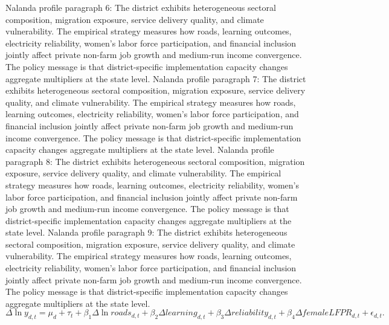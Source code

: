 \documentclass[preprint,12pt]{elsarticle}
\begin{document}
Nalanda profile paragraph 6: The district exhibits heterogeneous sectoral composition, migration exposure, service delivery quality, and climate vulnerability. The empirical strategy measures how roads, learning outcomes, electricity reliability, women's labor force participation, and financial inclusion jointly affect private non-farm job growth and medium-run income convergence. The policy message is that district-specific implementation capacity changes aggregate multipliers at the state level.
Nalanda profile paragraph 7: The district exhibits heterogeneous sectoral composition, migration exposure, service delivery quality, and climate vulnerability. The empirical strategy measures how roads, learning outcomes, electricity reliability, women's labor force participation, and financial inclusion jointly affect private non-farm job growth and medium-run income convergence. The policy message is that district-specific implementation capacity changes aggregate multipliers at the state level.
Nalanda profile paragraph 8: The district exhibits heterogeneous sectoral composition, migration exposure, service delivery quality, and climate vulnerability. The empirical strategy measures how roads, learning outcomes, electricity reliability, women's labor force participation, and financial inclusion jointly affect private non-farm job growth and medium-run income convergence. The policy message is that district-specific implementation capacity changes aggregate multipliers at the state level.
Nalanda profile paragraph 9: The district exhibits heterogeneous sectoral composition, migration exposure, service delivery quality, and climate vulnerability. The empirical strategy measures how roads, learning outcomes, electricity reliability, women's labor force participation, and financial inclusion jointly affect private non-farm job growth and medium-run income convergence. The policy message is that district-specific implementation capacity changes aggregate multipliers at the state level.
\begin{equation}\Delta \ln y_{d,t}=\mu_d+\tau_t+\beta_1\Delta\ln roads_{d,t}+\beta_2\Delta learning_{d,t}+\beta_3\Delta reliability_{d,t}+\beta_4\Delta femaleLFPR_{d,t}+\epsilon_{d,t}.\end{equation}
\end{document}
